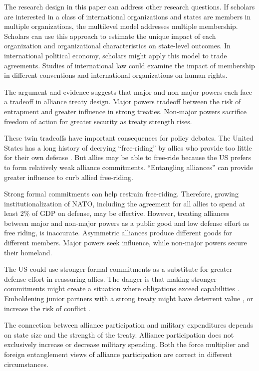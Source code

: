 \documentclass[12pt]{article}
\begin{document}
The research design in this paper can address other research questions.
If scholars are interested in a class of international organizations and states are members in multiple organizations, the multilevel model addresses multiple membership.
Scholars can use this approach to estimate the unique impact of each organization and organizational characteristics on state-level outcomes. 
In international political economy, scholars might apply this model to trade agreements. 
Studies of international law could examine the impact of membership in different conventions and international organizations on human rights. 


The argument and evidence suggests that major and non-major powers each face a tradeoff in alliance treaty design. 
Major powers tradeoff between the risk of entrapment and greater influence in strong treaties. 
Non-major powers sacrifice freedom of action for greater security as treaty strength rises. 


These twin tradeoffs have important consequences for policy debates.
The United States has a long history of decrying ``free-riding'' by allies who provide too little for their own defense \citep{Lanoszka2015}. 
But allies may be able to free-ride because the US prefers to form relatively weak alliance commitments. 
``Entangling alliances'' can provide greater influence to curb allied free-riding. 


Strong formal commitments can help restrain free-riding. 
Therefore, growing institutionalization of NATO, including the agreement for all allies to spend at least 2\% of GDP on defense, may be effective. 
However, treating alliances between major and non-major powers as a public good and low defense effort as free riding, is inaccurate. 
Asymmetric alliances produce different goods for different members. 
Major powers seek influence, while non-major powers secure their homeland. 


The US could use stronger formal commitments as a substitute for greater defense effort in reassuring allies.
The danger is that making stronger commitments might create a situation where obligations exceed capabilities \citep{Kennedy1987}. 
Emboldening junior partners with a strong treaty might have deterrent value \citep{Bensonetal2014}, or increase the risk of conflict \citep{Benson2012}. 

 
The connection between alliance participation and military expenditures depends on state size and the strength of the treaty.  
Alliance participation does not exclusively increase or decrease military spending.  
Both the force multiplier and foreign entanglement views of alliance participation are correct in different circumstances. 




\singlespace
 
 
\end{document}
